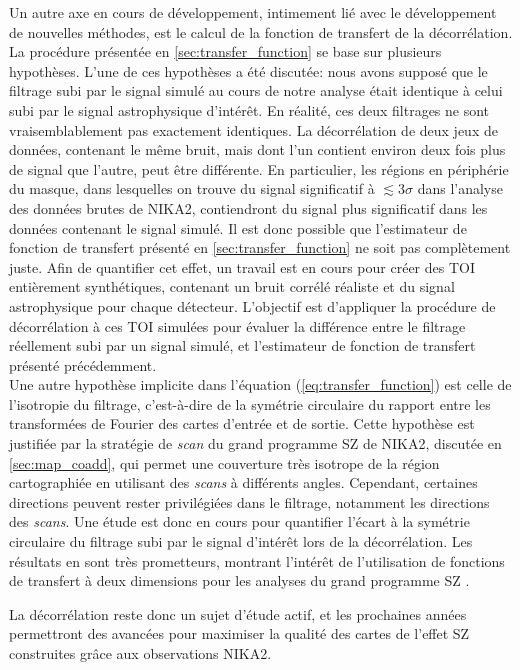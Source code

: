 Un autre axe en cours de développement, intimement lié avec le développement de nouvelles méthodes, est le calcul de la fonction de transfert de la décorrélation.
La procédure présentée en \ref{sec:transfer_function} se base sur plusieurs hypothèses.
L'une de ces hypothèses a été discutée: nous avons supposé que le filtrage subi par le signal simulé au cours de notre analyse était identique à celui subi par le signal astrophysique d'intérêt.
En réalité, ces deux filtrages ne sont vraisemblablement pas exactement identiques.
La décorrélation de deux jeux de données, contenant le même bruit, mais dont l'un contient environ deux fois plus de signal que l'autre, peut être différente.
En particulier, les régions en périphérie du masque, dans lesquelles on trouve du signal significatif à $\lesssim 3\sigma$ dans l'analyse des données brutes de NIKA2, contiendront du signal plus significatif dans les données contenant le signal simulé.
Il est donc possible que l'estimateur de fonction de transfert présenté en \ref{sec:transfer_function} ne soit pas complètement juste.
Afin de quantifier cet effet, un travail est en cours pour créer des TOI entièrement synthétiques, contenant un bruit corrélé réaliste et du signal astrophysique pour chaque détecteur.
L'objectif est d'appliquer la procédure de décorrélation à ces TOI simulées pour évaluer la différence entre le filtrage réellement subi par un signal simulé, et l'estimateur de fonction de transfert présenté précédemment. \\
Une autre hypothèse implicite dans l'équation (\ref{eq:transfer_function}) est celle de l'isotropie du filtrage, c'est-à-dire de la symétrie circulaire du rapport entre les transformées de Fourier des cartes d'entrée et de sortie.
Cette hypothèse est justifiée par la stratégie de \textit{scan} du grand programme SZ de NIKA2, discutée en \ref{sec:map_coadd}, qui permet une couverture très isotrope de la région cartographiée en utilisant des \textit{scans} à différents angles.
Cependant, certaines directions peuvent rester privilégiées dans le filtrage, notamment les directions des \textit{scans}.
Une étude est donc en cours pour quantifier l'écart à la symétrie circulaire du filtrage subi par le signal d'intérêt lors de la décorrélation.
Les résultats en sont très prometteurs, montrant l'intérêt de l'utilisation de fonctions de transfert à deux dimensions pour les analyses du grand programme SZ \cite{munoz_echevarria_multi-probe_2021}.

La décorrélation reste donc un sujet d'étude actif, et les prochaines années permettront des avancées pour maximiser la qualité des cartes de l'effet SZ construites grâce aux observations NIKA2.
